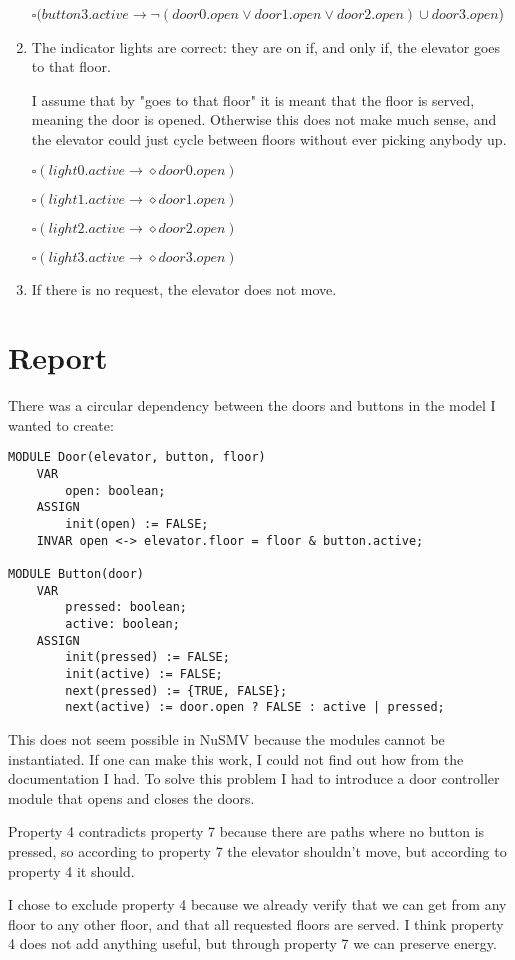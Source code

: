 \documentclass[12pt, a4paper]{article}
\begin{document}
\begin{enumerate}
	$\square (button3.active \rightarrow \lnot (door0.open \lor door1.open \lor door 2.open) \cup door3.open$)
	\item %
	The indicator lights are correct: they are on if, and only if, the elevator goes to that floor.

	I assume that by "goes to that floor" it is meant that the floor is served, meaning the door is opened. Otherwise this does not make much sense, and the elevator could just cycle between floors without ever picking anybody up.

	$\square (light0.active \rightarrow \diamond door0.open)$

	$\square (light1.active \rightarrow \diamond door1.open)$

	$\square (light2.active \rightarrow \diamond door2.open)$

	$\square (light3.active \rightarrow \diamond door3.open)$
	\item %
	If there is no request, the elevator does not move.
\end{enumerate}

\section{Report}
There was a circular dependency between the doors and buttons in the model I wanted to create:

\begin{lstlisting}
MODULE Door(elevator, button, floor)
	VAR
		open: boolean;
	ASSIGN
		init(open) := FALSE;
	INVAR open <-> elevator.floor = floor & button.active;

MODULE Button(door)
	VAR
		pressed: boolean;
		active: boolean;
	ASSIGN
		init(pressed) := FALSE;
		init(active) := FALSE;
		next(pressed) := {TRUE, FALSE};
		next(active) := door.open ? FALSE : active | pressed;
\end{lstlisting}

This does not seem possible in NuSMV because the modules cannot be instantiated. If one can make this work, I could not find out how from the documentation I had. To solve this problem I had to introduce a door controller module that opens and closes the doors.

Property 4 contradicts property 7 because there are paths where no button is pressed, so according to property 7 the elevator shouldn't move, but according to property 4 it should.

I chose to exclude property 4 because we already verify that we can get from any floor to any other floor, and that all requested floors are served. I think property 4 does not add anything useful, but through property 7 we can preserve energy.
\end{document}
